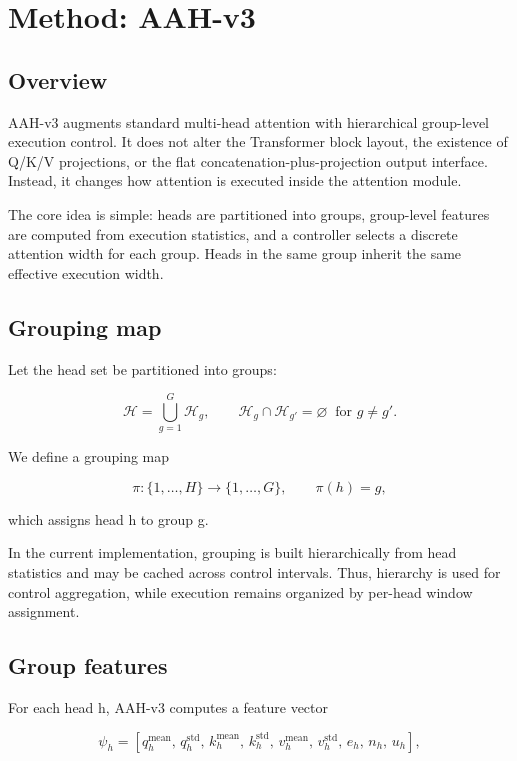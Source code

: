 \documentclass[11pt]{article}
\begin{document}
\section{Method: AAH-v3}

\subsection{Overview}

AAH-v3 augments standard multi-head attention with hierarchical group-level execution control. It does not alter the Transformer block layout, the existence of Q/K/V projections, or the flat concatenation-plus-projection output interface. Instead, it changes how attention is executed inside the attention module.

The core idea is simple: heads are partitioned into groups, group-level features are computed from execution statistics, and a controller selects a discrete attention width for each group. Heads in the same group inherit the same effective execution width.

\subsection{Grouping map}

Let the head set be partitioned into groups:

\[
\mathcal H = \bigcup_{g=1}^{G}\mathcal H_g,
\qquad
\mathcal H_g \cap \mathcal H_{g'} = \varnothing \;\; \text{for } g\neq g'.
\]

We define a grouping map

\[
\pi:\{1,\dots,H\}\to\{1,\dots,G\},\qquad \pi(h)=g,
\]

which assigns head h to group g.

In the current implementation, grouping is built hierarchically from head statistics and may be cached across control intervals. Thus, hierarchy is used for control aggregation, while execution remains organized by per-head window assignment.

\subsection{Group features}

For each head h, AAH-v3 computes a feature vector

\[
\psi_h=
\left[
q_h^{\mathrm{mean}},\,
q_h^{\mathrm{std}},\,
k_h^{\mathrm{mean}},\,
k_h^{\mathrm{std}},\,
v_h^{\mathrm{mean}},\,
v_h^{\mathrm{std}},\,
e_h,\,
n_h,\,
u_h
\right],
\]
\end{document}
